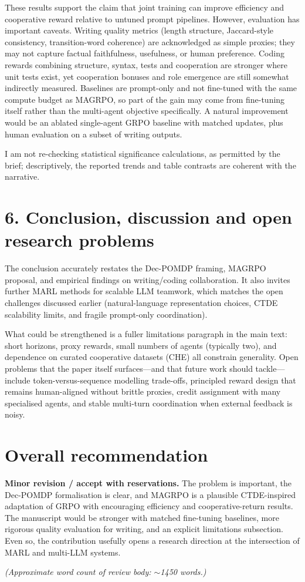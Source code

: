 \documentclass[11pt,a4paper]{article}
\begin{document}
These results support the claim that joint training can improve efficiency and cooperative reward relative to untuned prompt pipelines. However, evaluation has important caveats. Writing quality metrics (length structure, Jaccard-style consistency, transition-word coherence) are acknowledged as simple proxies; they may not capture factual faithfulness, usefulness, or human preference. Coding rewards combining structure, syntax, tests and cooperation are stronger where unit tests exist, yet cooperation bonuses and role emergence are still somewhat indirectly measured. Baselines are prompt-only and not fine-tuned with the same compute budget as MAGRPO, so part of the gain may come from fine-tuning itself rather than the multi-agent objective specifically. A natural improvement would be an ablated single-agent GRPO baseline with matched updates, plus human evaluation on a subset of writing outputs.

I am not re-checking statistical significance calculations, as permitted by the brief; descriptively, the reported trends and table contrasts are coherent with the narrative.

\section*{6. Conclusion, discussion and open research problems}
The conclusion accurately restates the Dec-POMDP framing, MAGRPO proposal, and empirical findings on writing/coding collaboration. It also invites further MARL methods for scalable LLM teamwork, which matches the open challenges discussed earlier (natural-language representation choices, CTDE scalability limits, and fragile prompt-only coordination).

What could be strengthened is a fuller limitations paragraph in the main text: short horizons, proxy rewards, small numbers of agents (typically two), and dependence on curated cooperative datasets (CHE) all constrain generality. Open problems that the paper itself surfaces---and that future work should tackle---include token-versus-sequence modelling trade-offs, principled reward design that remains human-aligned without brittle proxies, credit assignment with many specialised agents, and stable multi-turn coordination when external feedback is noisy.

\section*{Overall recommendation}
\textbf{Minor revision / accept with reservations.} The problem is important, the Dec-POMDP formalisation is clear, and MAGRPO is a plausible CTDE-inspired adaptation of GRPO with encouraging efficiency and cooperative-return results. The manuscript would be stronger with matched fine-tuning baselines, more rigorous quality evaluation for writing, and an explicit limitations subsection. Even so, the contribution usefully opens a research direction at the intersection of MARL and multi-LLM systems.

\vspace{1em}
\noindent\textit{(Approximate word count of review body: $\sim$1450 words.)}
\end{document}
